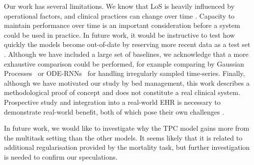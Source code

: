\documentclass[sigconf]{acmart}
\begin{document}
Our work has several limitations. We know that LoS is heavily influenced by operational factors, and clinical practices can change over time \citep{axel}. Capacity to maintain performance over time is an important consideration before a system could be used in practice. In future work, it would be instructive to test how quickly the models become out-of-date by reserving more recent data as a test set \citep{DBLP:journals/corr/abs-1811-12583}. 
Although we have included a large set of baselines, we acknowledge that a more exhaustive comparison could be performed, for example comparing by Gaussian Processes~\citep{DBLP:journals/corr/PrasadCCDE17} or ODE-RNNs~\citep{Rubanova2019LatentOF,Brouwer2019GRUODEBayesCM} for handling irregularly sampled time-series.
Finally, although we have motivated our study by bed management, this work describes a methodological proof of concept and does not constitute a real clinical system. Prospective study and integration into a real-world EHR is necessary to demonstrate real-world benefit, both of which pose their own challenges \citep{Rajkomar2018ScalableAA, sepsiswatch}.





In future work, we would like to investigate why the TPC model gains more from the multitask setting than the other models. It seems likely that it is related to additional regularisation provided by the mortality task, but further investigation is needed to confirm our speculations.
\end{document}
